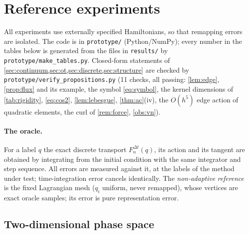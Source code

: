 \section{Reference experiments}\label{sec:numerics}

All experiments use externally specified Hamiltonians, so that remapping errors are isolated. The code is in
\texttt{prototype/} (Python/NumPy); every number in the tables below is generated from the files in
\texttt{results/} by \texttt{prototype/make\_tables.py}. Closed-form statements of
\cref{sec:continuum,sec:ot,sec:discrete,sec:structure} are checked by \texttt{prototype/verify\_propositions.py}
(11 checks, all passing: \cref{lem:edge}, \cref{prop:flux} and its example, the symbol \eqref{eq:symbol}, the kernel
dimensions of \cref{tab:rigidity}, \eqref{eq:cos2}, \cref{lem:lebesgue}, \cref{thm:ac}(iv), the $O(h^5)$ edge action
of quadratic elements, the curl of \cref{rem:force}, \cref{obs:vn}).

\paragraph{The oracle.} For a label $q$ the exact discrete transport $F^{\Delta t}_n(q)$, its action and its tangent
are obtained by integrating from the initial condition with the same integrator and step sequence. All errors are
measured against it, at the labels of the method under test; time-integration error cancels identically. The
\emph{non-adaptive reference} is the fixed Lagrangian mesh ($q_i$ uniform, never remapped), whose vertices are
exact oracle samples; its error is pure representation error.

\subsection{Two-dimensional phase space}\label{sec:num1d}

